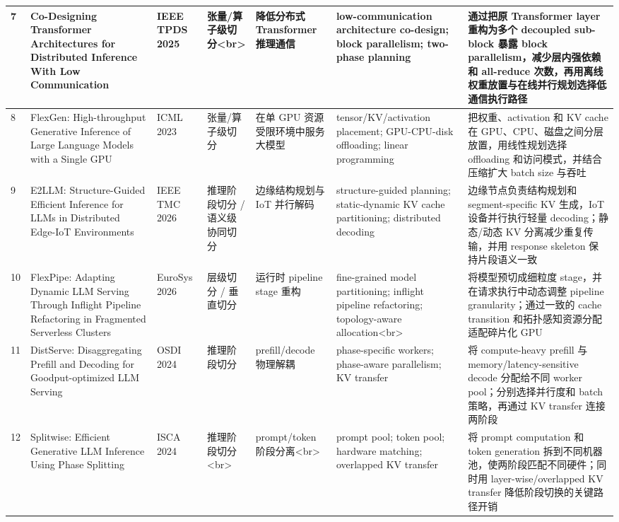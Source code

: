 \documentclass[a4paper,10pt]{ctexart}
\begin{document}
\begin{table}[H]
\begin{tabularx}{\textwidth}{|X|X|X|X|X|X|X|}
7 & Co-Designing Transformer Architectures for Distributed Inference With Low Communication & IEEE TPDS 2025 & 张量/算子级切分<br> & 降低分布式 Transformer 推理通信 & low-communication architecture co-design; block parallelism; two-phase planning & 通过把原 Transformer layer 重构为多个 decoupled sub-block 暴露 block parallelism，减少层内强依赖和 all-reduce 次数，再用离线权重放置与在线并行规划选择低通信执行路径 \\ \hline
8 & FlexGen: High-throughput Generative Inference of Large Language Models with a Single GPU & ICML 2023 & 张量/算子级切分 & 在单 GPU 资源受限环境中服务大模型 & tensor/KV/activation placement; GPU-CPU-disk offloading; linear programming & 把权重、activation 和 KV cache 在 GPU、CPU、磁盘之间分层放置，用线性规划选择 offloading 和访问模式，并结合压缩扩大 batch size 与吞吐 \\ \hline
9 & E2LLM: Structure-Guided Efficient Inference for LLMs in Distributed Edge-IoT Environments & IEEE TMC 2026 & 推理阶段切分 / 语义级协同切分 & 边缘结构规划与 IoT 并行解码 & structure-guided planning; static-dynamic KV cache partitioning; distributed decoding & 边缘节点负责结构规划和 segment-specific KV 生成，IoT 设备并行执行轻量 decoding；静态/动态 KV 分离减少重复传输，并用 response skeleton 保持片段语义一致 \\ \hline
10 & FlexPipe: Adapting Dynamic LLM Serving Through Inflight Pipeline Refactoring in Fragmented Serverless Clusters & EuroSys 2026 & 层级切分 / 垂直切分 & 运行时 pipeline stage 重构 & fine-grained model partitioning; inflight pipeline refactoring; topology-aware allocation<br> & 将模型预切成细粒度 stage，并在请求执行中动态调整 pipeline granularity；通过一致的 cache transition 和拓扑感知资源分配适配碎片化 GPU \\ \hline
11 & DistServe: Disaggregating Prefill and Decoding for Goodput-optimized LLM Serving & OSDI 2024 & 推理阶段切分 & prefill/decode 物理解耦 & phase-specific workers; phase-aware parallelism; KV transfer & 将 compute-heavy prefill 与 memory/latency-sensitive decode 分配给不同 worker pool；分别选择并行度和 batch 策略，再通过 KV transfer 连接两阶段 \\ \hline
12 & Splitwise: Efficient Generative LLM Inference Using Phase Splitting & ISCA 2024 & 推理阶段切分<br> & prompt/token 阶段分离<br> & prompt pool; token pool; hardware matching; overlapped KV transfer & 将 prompt computation 和 token generation 拆到不同机器池，使两阶段匹配不同硬件；同时用 layer-wise/overlapped KV transfer 降低阶段切换的关键路径开销 \\ \hline

\end{tabularx}
\end{table}
\end{document}
